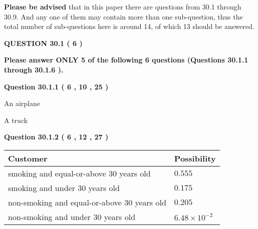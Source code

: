 \documentclass[12pt]{article}
\begin{document}
 
 
{\textbf{\large{Please be advised}}} that in this paper there are questions from
30.1 through
30.9.
And any one of them may contain more than one sub-question, thus the total number
of sub-questions here is around 14, of which
13 should be answered.
 
\vspace{0.3in}
 
 
   
   
  
\vspace{0.2in}
  
{\textbf{\Large{QUESTION
30.1 
 (           6 )
}}}
  
  
{\textbf{\Large{Please answer ONLY  %
           5  %
 of the following  %
           6  %
 questions (Questions  %
30.1.1 %
 through  %
30.1.6 %
 ). }}}
   
   
  
\vspace{0.2in}
  
{\textbf{\Large{Question
30.1.1 
 (           6 ,          10 ,          25 )
}}}
  
  
 
 
\noindent{}
 
 
An airplane
 
 
A truck
 
 
 
 
  
\vspace{0.2in}
  
{\textbf{\Large{Question
30.1.2 
 (           6 ,          12 ,          27 )
}}}
  
  
 
 
\noindent{}

 
\noindent
\begin{tabular}{|l|l|}
\hline
Customer & Possibility \\
\hline
smoking  and  %
equal-or-above 30 years old &
  $ %
0.555$ \\
\hline
smoking  and  %
under 30 years old &
  $ %
0.175$ \\
\hline
 non-smoking and  %
equal-or-above 30 years old &
  $ %
0.205$ \\
\hline
 non-smoking and  %
under 30 years old &
  $ %
6.48 \times 10^{-2}$ \\
\hline
\end{tabular}
 
\end{document}
